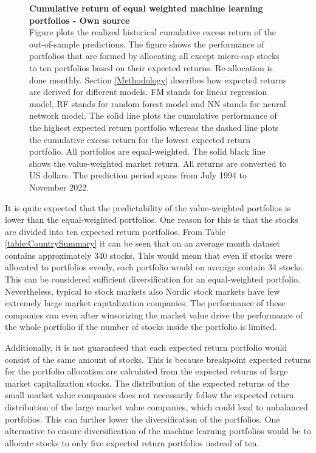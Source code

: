 \documentclass[12pt]{article}
\begin{document}
\begin{figure}[ht]
\centering
\caption[Cumulative return of equal weighted machine learning portfolios]{\textbf{Cumulative return of equal weighted machine learning portfolios \textnormal{- Own source}}\\ Figure plots the realized historical cumulative excess return of the out-of-sample predictions. The figure shows the performance of portfolios that are formed by allocating all except micro-cap stocks to ten portfolios based on their expected returns. Re-allocation is done monthly. Section \ref{Methodology} describes how expected returns are derived for different models. FM stands for linear regression model, RF stands for random forest model and NN stands for neural network model. The solid line plots the cumulative performance of the highest expected return portfolio whereas the dashed line plots the cumulative excess return for the lowest expected return portfolio. All portfolios are equal-weighted. The solid black line shows the value-weighted market return. All returns are converted to US dollars. The prediction period spans from July 1994 to November 2022.}

\label{plot:cumul_ew_portf_return}
\end{figure}

It is quite expected that the predictability of the value-weighted portfolios is lower than the equal-weighted portfolios. One reason for this is that the stocks are divided into ten expected return portfolios. From Table \ref{table:CountrySummary} it can be seen that on an average month dataset contains approximately 340 stocks. This would mean that even if stocks were allocated to portfolios evenly, each portfolio would on average contain 34 stocks. This can be considered sufficient diversification for an equal-weighted portfolio. Nevertheless, typical to stock markets also Nordic stock markets have few extremely large market capitalization companies. The performance of these companies can even after winsorizing the market value drive the performance of the whole portfolio if the number of stocks inside the portfolio is limited. \par

Additionally, it is not guaranteed that each expected return portfolio would consist of the same amount of stocks. This is because breakpoint expected returns for the portfolio allocation are calculated from the expected returns of large market capitalization stocks. The distribution of the expected returns of the small market value companies does not necessarily follow the expected return distribution of the large market value companies, which could lead to unbalanced portfolios. This can further lower the diversification of the portfolios. One alternative to ensure diversification of the machine learning portfolios would be to allocate stocks to only five expected return portfolios instead of ten. \par
\end{document}
